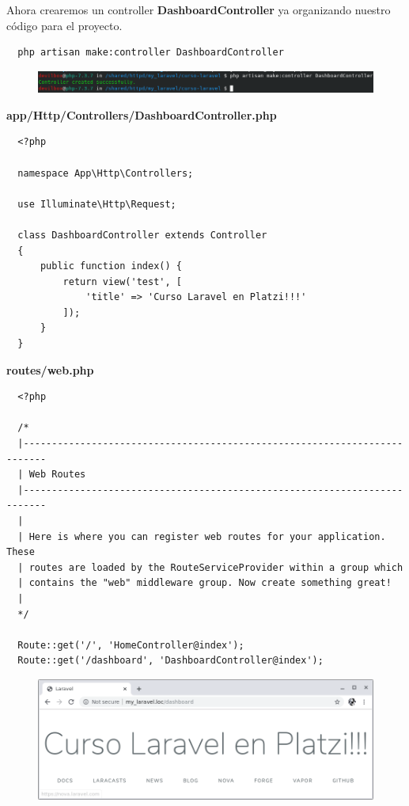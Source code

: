 \documentclass{article}
\begin{document}
Ahora crearemos un controller \textbf{DashboardController} ya organizando
nuestro código para el proyecto.\\

\begin{verbatim}
  php artisan make:controller DashboardController
\end{verbatim}

\begin{figure}[h!]
  \centering
  \includegraphics[scale=0.5]{./Pictures/014_dashboardController.png}
\end{figure}

\textbf{app/Http/Controllers/DashboardController.php}
\begin{verbatim}
  <?php

  namespace App\Http\Controllers;

  use Illuminate\Http\Request;

  class DashboardController extends Controller
  {
      public function index() {
          return view('test', [
              'title' => 'Curso Laravel en Platzi!!!'
          ]);
      }
  }
\end{verbatim}


\textbf{routes/web.php}
\begin{verbatim}
  <?php

  /*
  |--------------------------------------------------------------------------
  | Web Routes
  |--------------------------------------------------------------------------
  |
  | Here is where you can register web routes for your application. These
  | routes are loaded by the RouteServiceProvider within a group which
  | contains the "web" middleware group. Now create something great!
  |
  */

  Route::get('/', 'HomeController@index');
  Route::get('/dashboard', 'DashboardController@index');
\end{verbatim}

\begin{figure}[h!]
  \centering
  \includegraphics[scale=0.5]{./Pictures/013_dashboardController.png}
\end{figure}
\end{document}

